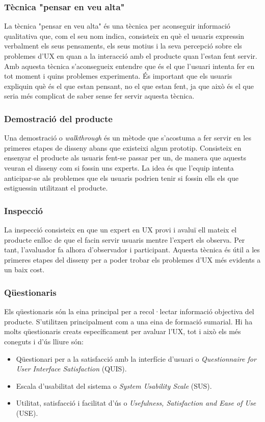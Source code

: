 \subsubsection{Tècnica "pensar en veu alta"}
La tècnica "pensar en veu alta" és una tècnica per aconseguir informació qualitativa que, com el seu nom indica, consisteix en què el usuaris expressin verbalment els seus pensaments, els seus motius i la seva percepció sobre els problemes d'\ac{UX} en quan a la interacció amb el producte quan l'estan fent servir. Amb aquesta tècnica s'aconsegueix entendre que és el que l'usuari intenta fer en tot moment i quins problemes experimenta.
És important que els usuaris expliquin què és el que estan pensant, no el que estan fent, ja que això és el que seria més complicat de saber sense fer servir aquesta tècnica.  
\subsubsection{Demostració del producte}
Una demostració o \textit{walkthrough} és un mètode que s'acostuma a fer servir en les primeres etapes de disseny abans que existeixi algun prototip. Consisteix en ensenyar el producte als usuaris fent-se passar per un, de manera que aquests veuran el disseny com si fossin uns experts. La idea és que l'equip intenta anticipar-se als problemes que els usuaris podrien tenir si fossin ells els que estiguessin utilitzant el producte. 
\subsubsection{Inspecció} 
La inspecció consisteix en que un expert en UX provi i avaluï ell mateix el producte enlloc de que el facin servir usuaris mentre l'expert els observa. Per tant, l'avaluador fa alhora d'observador i participant. Aquesta tècnica és útil a les primeres etapes del disseny per a poder trobar els problemes d'\ac{UX} més evidents a un baix cost. 
\subsubsection{Qüestionaris}
Els qüestionaris són la eina principal per a recol·lectar informació objectiva del producte. S'utilitzen principalment com a una eina de formació sumarial. Hi ha molts qüestionaris creats específicament per avaluar l'\ac{UX}, tot i això els més coneguts i d'ús lliure són:
\begin{itemize}
\item Qüestionari per a la satisfacció amb la interfície d'usuari o \textit{Questionnaire for User Interface Satisfaction} (QUIS).
\item Escala d'usabilitat del sistema o \textit{System Usability Scale} (SUS).
\item Utilitat, satisfacció i facilitat d'ús o \textit{Usefulness, Satisfaction and Ease of Use} (USE).
\end{itemize}

